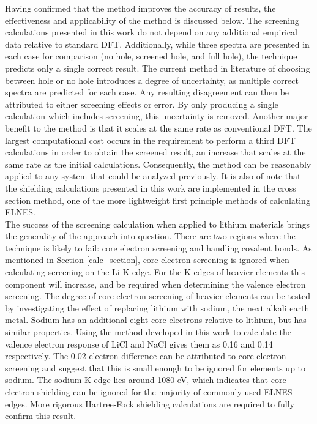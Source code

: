 Having confirmed that the method improves the accuracy of results, the effectiveness and applicability of the method is discussed below. The screening calculations presented in this work do not depend on any additional empirical data relative to standard DFT.  Additionally, while three spectra are presented in each case for comparison (no hole, screened hole, and full hole), the technique predicts only a single correct result.  The current method in literature of choosing between hole or no hole introduces a degree of uncertainty, as multiple correct spectra are predicted for each case.   Any resulting disagreement can then be attributed to either screening effects or error. By only producing a single calculation which includes screening, this uncertainty is removed.  Another major benefit to the method is that it scales at the same rate as conventional DFT.  The largest computational cost occurs in the requirement to perform a third DFT calculations in order to obtain the screened result, an increase that scales at the same rate as the initial calculations.  Consequently, the method can be reasonably applied to any system that could be analyzed previously.  It is also of note that the shielding calculations presented in this work are implemented in the cross section method, one of the more lightweight first principle methods of calculating ELNES.\\



The success of the screening calculation when applied to lithium materials brings the generality of the approach into question. There are two regions where the technique is likely to fail: core electron screening and handling covalent bonds.  As mentioned in Section \ref{calc_section}, core electron screening is ignored when calculating screening on the Li K edge.  For the K edges of heavier elements this component will increase, and be required when determining the valence electron screening. The degree of core electron screening of heavier elements can be tested by investigating the effect of replacing lithium with sodium, the next alkali earth metal.  Sodium has an additional eight core electrons relative to lithium, but has similar properties.  Using the method developed in this work to calculate the valence electron response of LiCl and NaCl gives them as 0.16 and 0.14 respectively.  The 0.02 electron difference can be attributed to core electron screening and suggest that this is small enough to be ignored for elements up to sodium.  The sodium K edge lies around 1080 eV, which indicates that core electron shielding can be ignored for the majority of commonly used ELNES edges.  More rigorous Hartree-Fock shielding calculations are required to fully confirm this result. \\ 

